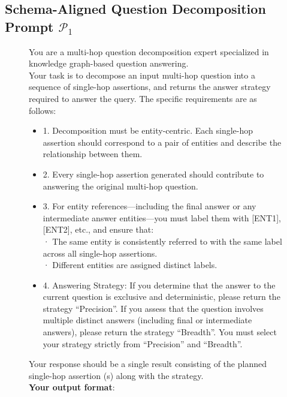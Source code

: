 \documentclass[11pt]{article}
\begin{document}
\subsection{Schema-Aligned Question Decomposition Prompt \hyperref[fig:p1]{$ \mathcal{P}_1 $}}
\begin{figure}[H]
    \centering
    \footnotesize
    \begin{tcolorbox}[
        title={Schema-Aligned Question Decomposition Prompt ($\mathcal{P}_1$)},      %
        colback=gray!5,                        %
        colframe=gray!60,                  %
        coltitle=white,                       %
        fonttitle=\small\bfseries,            %
        boxrule=0.8pt,                        %
        left=2mm, right=2mm, top=2mm, bottom=2mm, %
        arc=1mm,                              %
        width=\columnwidth                      %
    ]
    
    You are a multi-hop question decomposition expert specialized in knowledge graph-based question answering. \\ Your task is to decompose an input multi-hop question into a sequence of single-hop assertions, and returns the answer strategy required to answer the query. The specific requirements are as follows:
    \begin{itemize}
    \item 1. Decomposition must be entity-centric. Each single-hop assertion should correspond to a pair of entities and describe the relationship between them. 
    \item 2. Every single-hop assertion generated should contribute to answering the original multi-hop question.
    \item 3. For entity references—including the final answer or any intermediate answer entities—you must label them with [ENT1], [ENT2], etc., and ensure that: \\
    \text{      }· The same entity is consistently referred to with the same label across all single-hop assertions.\\
    \text{      }· Different entities are assigned distinct labels. 
    \item 4. Answering Strategy: If you determine that the answer to the current question is exclusive and deterministic, please return the strategy ``Precision''. If you assess that the question involves multiple distinct answers (including final or intermediate answers), please return the strategy ``Breadth''. You must select your strategy strictly from ``Precision'' and ``Breadth''. \\
    \end{itemize}
    Your response should be a single result consisting of the planned single-hop assertion (s) along with the strategy. \\
    \textbf{Your output format}: \\
     \


\end{tcolorbox}
\end{figure}
\end{document}
